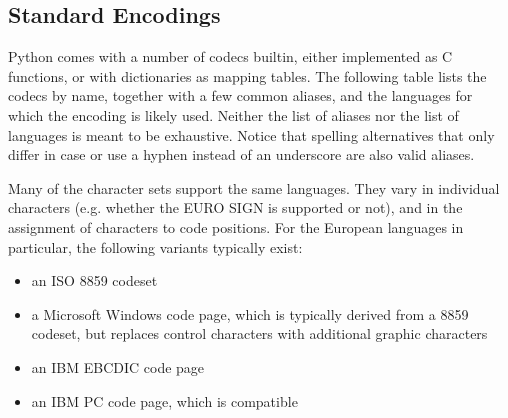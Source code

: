 \subsection{Standard Encodings\label{standard-encodings}}

Python comes with a number of codecs builtin, either implemented as C
functions, or with dictionaries as mapping tables. The following table
lists the codecs by name, together with a few common aliases, and the
languages for which the encoding is likely used. Neither the list of
aliases nor the list of languages is meant to be exhaustive. Notice
that spelling alternatives that only differ in case or use a hyphen
instead of an underscore are also valid aliases.

Many of the character sets support the same languages. They vary in
individual characters (e.g. whether the EURO SIGN is supported or
not), and in the assignment of characters to code positions. For the
European languages in particular, the following variants typically
exist:

\begin{itemize}
\item an ISO 8859 codeset
\item a Microsoft Windows code page, which is typically derived from
      a 8859 codeset, but replaces control characters with additional
      graphic characters
\item an IBM EBCDIC code page
\item an IBM PC code page, which is \ASCII{} compatible
\end{itemize}


